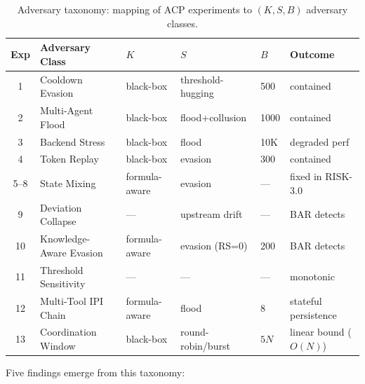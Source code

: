 \documentclass[11pt]{article}
\theoremstyle{definition}
\begin{document}
\begin{table}[h!]
\centering\small
\caption{Adversary taxonomy: mapping of ACP experiments to $(K, S, B)$ adversary classes.}
\label{tab:adversary-taxonomy}
\begin{tabular}{@{}clllll@{}}
\toprule
Exp & Adversary Class & $K$ & $S$ & $B$ & Outcome \\
\midrule
1 & Cooldown Evasion       & black-box     & threshold-hugging & 500   & contained \\
2 & Multi-Agent Flood      & black-box     & flood+collusion   & 1000  & contained \\
3 & Backend Stress         & black-box     & flood             & 10K   & degraded perf \\
4 & Token Replay           & black-box     & evasion           & 300   & contained \\
5--8 & State Mixing        & formula-aware & evasion           & —     & fixed in RISK-3.0 \\
9 & Deviation Collapse     & —             & upstream drift    & —     & BAR detects \\
10 & Knowledge-Aware Evasion & formula-aware & evasion (RS=0) & 200   & BAR detects \\
11 & Threshold Sensitivity  & —             & —                 & —     & monotonic \\
12 & Multi-Tool IPI Chain   & formula-aware & flood             & 8     & stateful persistence \\
13 & Coordination Window    & black-box     & round-robin/burst & $5N$  & linear bound ($O(N)$) \\
\bottomrule
\end{tabular}
\end{table}

Five findings emerge from this taxonomy:
\end{document}
